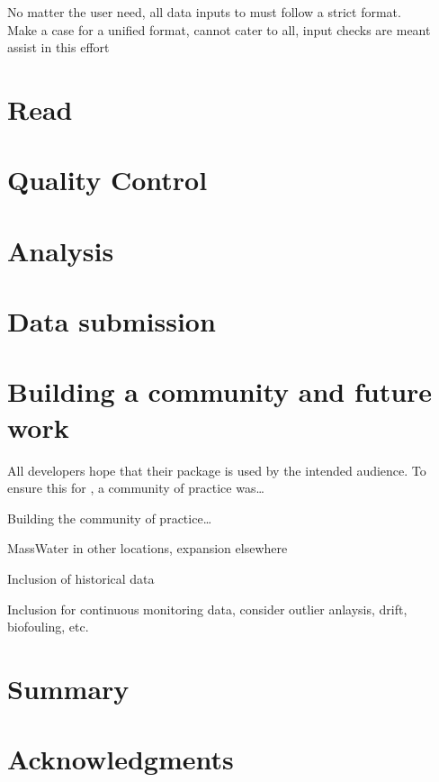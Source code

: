 No matter the user need, all data inputs to  must follow a strict format.\\
Make a case for a unified format, cannot cater to all, input checks are meant assist in this effort

\hypertarget{read}{%
\section{Read}\label{read}}

\hypertarget{quality-control}{%
\section{Quality Control}\label{quality-control}}

\hypertarget{analysis}{%
\section{Analysis}\label{analysis}}

\hypertarget{data-submission}{%
\section{Data submission}\label{data-submission}}

\hypertarget{building-a-community-and-future-work}{%
\section{Building a community and future work}\label{building-a-community-and-future-work}}

All developers hope that their package is used by the intended audience. To ensure this for , a community of practice was\ldots{}

Building the community of practice\ldots{}

MassWater in other locations, expansion elsewhere

Inclusion of historical data

Inclusion for continuous monitoring data, consider outlier anlaysis, drift, biofouling, etc.

\hypertarget{summary}{%
\section{Summary}\label{summary}}

\hypertarget{acknowledgments}{%
\section{Acknowledgments}\label{acknowledgments}}

